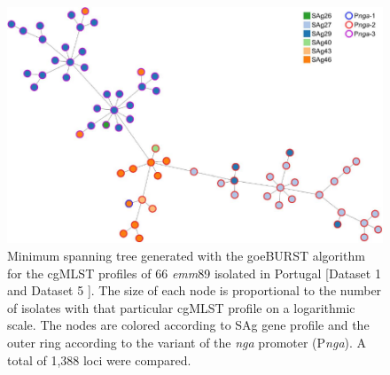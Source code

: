 \newpage
\begin{figure}[!ht]
    \centering
    \includegraphics[angle=0,width=\textwidth]{figures/chapter 4/FigureS17.pdf}
    \caption[Minimum spanning tree generated with the goeBURST algorithm for the cgMLST profiles of 66 \textit{emm}89 isolated in Portugal.]{Minimum spanning tree generated with the goeBURST algorithm for the \ac{cgMLST} profiles of 66 \textit{emm}89 isolated in Portugal [Dataset 1 and Dataset 5 \cite{friaes_supplemental_2023}]. The size of each node is proportional to the number of isolates with that particular \ac{cgMLST} profile on a logarithmic scale. The nodes are colored according to SAg gene profile and the outer ring according to the variant of the \textit{nga} promoter (P\textit{nga}). A total of 1,388 loci were compared.}
    \label{fig:chap4_figureS17}
\end{figure}

